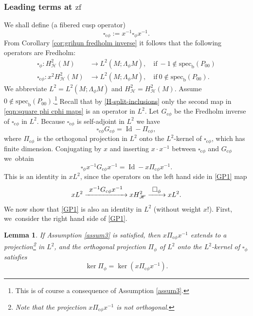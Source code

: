 \documentclass[JEP,XML,SOM,Unicode,NoFloatCountersInSection,published]{cedram}
\newcommand\To[1]{\mathchoice{\xrightarrow{\textstyle\kern4pt#1\kern3pt}}{\stackrel{#1}{\longrightarrow}}{}{}}
\newcommand{\cphi}{{\mathrm{c}\phi}}
\theoremstyle{plain}
\newtheorem{Lemma}[Th]{Lemma}
\theoremstyle{definition}
\newcommand{\bb}{{\mathrm{b}}}
\newcommand{\zf}{{\mathrm{zf}}}
\newcommand{\specb}{\mathrm{spec}_\bb}
\DeclareMathOperator{\Id}{Id}
\newcommand{\Hsplit}{H_{\mathscr{H}}}
\begin{document}
\subsubsection{Leading terms at $\zf$}
We shall define (a fibered cusp operator)
\[
\square_{\cphi} := x^{-1}\square_\phi x^{-1}.
\]
From Corollary \ref{cor:grihun fredholm inverse} it follows that the following operators are Fredholm:
\begin{equation}
\label{eqn:square phi cphi maps}
\begin{split}
\square_\phi:H^2_{\mathscr{H}}(M)
&\to L^2(M;\Lambda_\phi M), \quad \text{if} \ -1 \notin \specb(P_{00}) \\
\square_{\cphi}:x^2H^2_{\mathscr{H}}(M)
&\to L^2(M;\Lambda_\phi M), \quad \text{if} \ 0 \notin \specb(P_{00}).
\end{split}
\end{equation}
We abbreviate $L^2=L^2(M;\Lambda_\phi M)$ and $H^2_{\mathscr{H}} = H^2_{\mathscr{H}}(M)$.
Assume $0\not\in \specb(P_{00})$.\footnote{This is of course a consequence of Assumption \ref{assum3}.}
Recall that by \eqref{H-split-inclusions} only the
second map in \eqref{eqn:square phi cphi maps} is an operator in $L^2$. Let $G_{\cphi}$ be the Fredholm inverse of $\square_{\cphi}$ in $L^2$. Because $\square_{\cphi}$ is self-adjoint in $L^2$ we have
\begin{equation}\label{cphi-Fredholm}
\square_{\cphi}G_{\cphi} = \Id - \Pi_{\cphi},
\end{equation}
where $\Pi_{\cphi}$ is the orthogonal projection in $L^2$ onto the $L^2$-kernel of $\square_{\cphi}$, which has finite dimension.
Conjugating by $x$ and inserting $x\cdot x^{-1}$ between $\square_{\cphi}$ and $G_{\cphi} $ we~obtain
\begin{equation}\label{GP1}
\square_{\phi} x^{-1} G_{\cphi} x^{-1} = \Id - x \Pi_{\cphi} x^{-1}.
\end{equation}
This is an identity in $x L^2$, since the operators on the left hand side in \eqref{GP1} map
\[
xL^2 \To{x^{-1} G_{\cphi} x^{-1} } x \Hsplit^2 \To{\square_\phi} xL^2.
\]
We now show that \eqref{GP1} is also an identity in $L^2$ (without weight $x$!).
First, we~consider the right hand side of \eqref{GP1}.
\begin{Lemma} \label{lem:ker piphi}
If Assumption \ref{assum3} is satisfied, then $x\Pi_{\cphi}x^{-1}$ extends to a projection\footnote{Note that the projection $x\Pi_{\cphi}x^{-1}$ is not orthogonal.} in $L^2$, and the orthogonal
projection $\Pi_\phi$ of $L^2$ onto the $L^2$-kernel of $\square_{\phi}$ satisfies
\[
\ker \Pi_\phi = \ker \left(x \Pi_{\cphi} x^{-1} \right).
\]
\end{Lemma}
\end{document}
